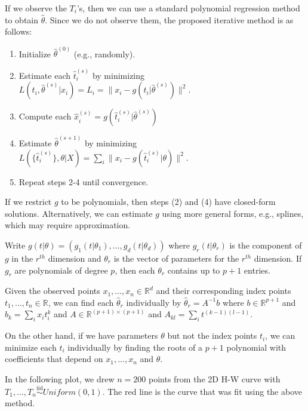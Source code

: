\documentclass[
  11pt,
]{article}
\providecommand{\tightlist}{%
  \setlength{\itemsep}{0pt}\setlength{\parskip}{0pt}}
\begin{document}
If we observe the \(T_i\)'s, then we can use a standard polynomial
regression method to obtain \(\hat{\theta}\). Since we do not observe
them, the proposed iterative method is as follows:

\begin{enumerate}
\def\labelenumi{\arabic{enumi}.}
\tightlist
\item
  Initialize \(\hat{\theta}^{(0)}\) (e.g., randomly).
\item
  Estimate each \(\hat{t}_i^{(s)}\) by minimizing
  \(L(t_i, \hat{\theta}^{(s)} | x_i) = L_i = \|x_i - g(t_i | \hat{\theta}^{(s)})\|^2\).
\item
  Compute each
  \(\hat{x}_i^{(s)} = g(\hat{t}_i^{(s)} | \hat{\theta}^{(s)})\)
\item
  Estimate \(\hat{\theta}^{(s+1)}\) by minimizing
  \(L(\{\hat{t}_i^{(s)}\}, \theta | X) = \sum_i \|x_i - g(\hat{t}_i^{(s)} | \theta)\|^2\).
\item
  Repeat steps 2-4 until convergence.
\end{enumerate}

If we restrict \(g\) to be polynomials, then steps (2) and (4) have
closed-form solutions. Alternatively, we can estimate \(g\) using more
general forms, e.g., splines, which may require approximation.

\begin{example}

Write $g(t | \theta) = (g_1(t | \theta_1), ..., g_d(t | \theta_d))$ where $g_r(t | \theta_r)$ is the component of $g$ in the $r^{th}$ dimension and $\theta_r$ is the vector of parameters for the $r^{th}$ dimension. If $g_r$ are polynomials of degree $p$, then each $\theta_r$ contains up to $p + 1$ entries. 

Given the observed points $x_1, ..., x_n \in \mathbb{R}^d$ and their corresponding index points $t_1, ..., t_n \in \mathbb{R}$, we can find each $\hat{\theta}_r$ individually by $\hat{\theta}_r = A^{-1} b$ where $b \in \mathbb{R}^{p+1}$ and $b_k = \sum_i x_i t_i^k$ and $A \in \mathbb{R}^{(p+1) \times (p+1)}$ and $A_{kl} = \sum_i t^{(k-1) (l-1)}$.

On the other hand, if we have parameters $\theta$ but not the index points $t_i$, we can minimize each $t_i$ individually by finding the roots of a $p+1$ polynomial with coefficients that depend on $x_1, ..., x_n$ and $\theta$. 

In the following plot, we drew $n = 200$ points from the 2D H-W curve with $T_1, ..., T_n \stackrel{\mathrm{iid}}{\sim}Uniform(0, 1)$. 
The red line is the curve that was fit using the above method. 

\end{example}
\end{document}
